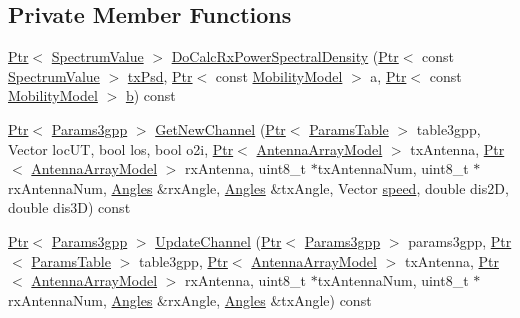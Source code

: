 \subsection*{Private Member Functions}
\begin{DoxyCompactItemize}
\item 
\hyperlink{classns3_1_1Ptr}{Ptr}$<$ \hyperlink{classns3_1_1SpectrumValue}{Spectrum\+Value} $>$ \hyperlink{classns3_1_1MmWave3gppChannel_a598876f469ba922150b9d9b86e160ca0}{Do\+Calc\+Rx\+Power\+Spectral\+Density} (\hyperlink{classns3_1_1Ptr}{Ptr}$<$ const \hyperlink{classns3_1_1SpectrumValue}{Spectrum\+Value} $>$ \hyperlink{lte__link__budget__x2__handover__measures_8m_a684fe3101a5e48a5fcc57cab8dbcd1aa}{tx\+Psd}, \hyperlink{classns3_1_1Ptr}{Ptr}$<$ const \hyperlink{classns3_1_1MobilityModel}{Mobility\+Model} $>$ a, \hyperlink{classns3_1_1Ptr}{Ptr}$<$ const \hyperlink{classns3_1_1MobilityModel}{Mobility\+Model} $>$ \hyperlink{lte__pathloss_8m_a21ad0bd836b90d08f4cf640b4c298e7c}{b}) const 
\item 
\hyperlink{classns3_1_1Ptr}{Ptr}$<$ \hyperlink{structns3_1_1Params3gpp}{Params3gpp} $>$ \hyperlink{classns3_1_1MmWave3gppChannel_aef5bd6982d739715d7bbba3166e75116}{Get\+New\+Channel} (\hyperlink{classns3_1_1Ptr}{Ptr}$<$ \hyperlink{structns3_1_1ParamsTable}{Params\+Table} $>$ table3gpp, Vector loc\+UT, bool los, bool o2i, \hyperlink{classns3_1_1Ptr}{Ptr}$<$ \hyperlink{classns3_1_1AntennaArrayModel}{Antenna\+Array\+Model} $>$ tx\+Antenna, \hyperlink{classns3_1_1Ptr}{Ptr}$<$ \hyperlink{classns3_1_1AntennaArrayModel}{Antenna\+Array\+Model} $>$ rx\+Antenna, uint8\+\_\+t $\ast$tx\+Antenna\+Num, uint8\+\_\+t $\ast$rx\+Antenna\+Num, \hyperlink{structns3_1_1Angles}{Angles} \&rx\+Angle, \hyperlink{structns3_1_1Angles}{Angles} \&tx\+Angle, Vector \hyperlink{mmwave-amc-test_8cc_a6dc6e6f3c75c509ce943163afb5dade7}{speed}, double dis2D, double dis3D) const 
\item 
\hyperlink{classns3_1_1Ptr}{Ptr}$<$ \hyperlink{structns3_1_1Params3gpp}{Params3gpp} $>$ \hyperlink{classns3_1_1MmWave3gppChannel_a765f45f9d98c15655c8ea6288e86f111}{Update\+Channel} (\hyperlink{classns3_1_1Ptr}{Ptr}$<$ \hyperlink{structns3_1_1Params3gpp}{Params3gpp} $>$ params3gpp, \hyperlink{classns3_1_1Ptr}{Ptr}$<$ \hyperlink{structns3_1_1ParamsTable}{Params\+Table} $>$ table3gpp, \hyperlink{classns3_1_1Ptr}{Ptr}$<$ \hyperlink{classns3_1_1AntennaArrayModel}{Antenna\+Array\+Model} $>$ tx\+Antenna, \hyperlink{classns3_1_1Ptr}{Ptr}$<$ \hyperlink{classns3_1_1AntennaArrayModel}{Antenna\+Array\+Model} $>$ rx\+Antenna, uint8\+\_\+t $\ast$tx\+Antenna\+Num, uint8\+\_\+t $\ast$rx\+Antenna\+Num, \hyperlink{structns3_1_1Angles}{Angles} \&rx\+Angle, \hyperlink{structns3_1_1Angles}{Angles} \&tx\+Angle) const 

\end{DoxyCompactItemize}
